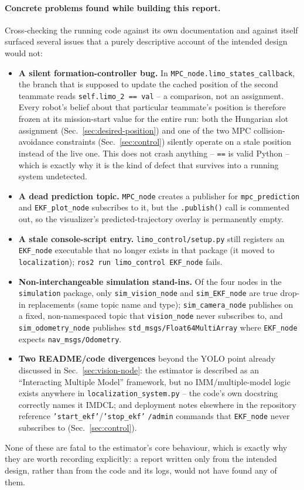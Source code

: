 \documentclass[10pt,conference]{IEEEtran}
\begin{document}
\paragraph{Concrete problems found while building this report.} Cross-checking the running code
against its own documentation and against itself surfaced several issues that a purely
descriptive account of the intended design would not:
\begin{itemize}
\item \textbf{A silent formation-controller bug.} In
\texttt{MPC\_node.limo\_states\_callback}, the branch that is supposed to update the cached
position of the second teammate reads \texttt{self.limo\_2 == val} -- a comparison, not an
assignment. Every robot's belief about that particular teammate's position is therefore frozen at
its mission-start value for the entire run: both the Hungarian slot assignment
(Sec.~\ref{sec:desired-position}) and one of the two MPC collision-avoidance constraints
(Sec.~\ref{sec:control}) silently operate on a stale position instead of the live one. This does
not crash anything -- \texttt{==} is valid Python -- which is exactly why it is the kind of defect
that survives into a running system undetected.
\item \textbf{A dead prediction topic.} \texttt{MPC\_node} creates a publisher for
\texttt{mpc\_prediction} and \texttt{EKF\_plot\_node} subscribes to it, but the
\texttt{.publish()} call is commented out, so the visualizer's predicted-trajectory overlay is
permanently empty.
\item \textbf{A stale console-script entry.} \texttt{limo\_control/setup.py} still registers an
\texttt{EKF\_node} executable that no longer exists in that package (it moved to
\texttt{localization}); \texttt{ros2 run limo\_control EKF\_node} fails.
\item \textbf{Non-interchangeable simulation stand-ins.} Of the four nodes in the
\texttt{simulation} package, only \texttt{sim\_vision\_node} and \texttt{sim\_EKF\_node} are true
drop-in replacements (same topic name and type); \texttt{sim\_camera\_node} publishes on a fixed,
non-namespaced topic that \texttt{vision\_node} never subscribes to, and
\texttt{sim\_odometry\_node} publishes \texttt{std\_msgs/Float64MultiArray} where
\texttt{EKF\_node} expects \texttt{nav\_msgs/Odometry}.
\item \textbf{Two README/code divergences} beyond the YOLO point already discussed in
Sec.~\ref{sec:vision-node}: the estimator is described as an ``Interacting Multiple Model''
framework, but no IMM/multiple-model logic exists anywhere in \texttt{localization\_system.py} --
the code's own docstring correctly names it IMDCL; and deployment notes elsewhere in the
repository reference \texttt{'start\_ekf'}/\texttt{'stop\_ekf'} \texttt{/admin} commands that
\texttt{EKF\_node} never subscribes to (Sec.~\ref{sec:control}).
\end{itemize}
None of these are fatal to the estimator's core behaviour, which is exactly why they are worth
recording explicitly: a report written only from the intended design, rather than from the code
and its logs, would not have found any of them.
\end{document}
